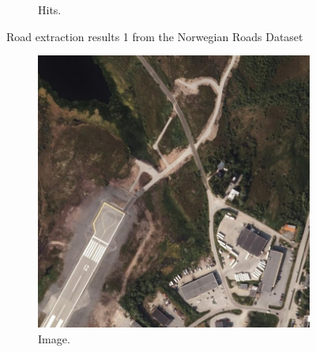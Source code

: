 \begin{figure}[H]
\begin{subfigure}{0.23\textwidth}
\caption{Hits.}
\vspace{0.2cm} %
\end{subfigure}
\caption[Norway Road extraction results 1]{Road extraction results 1 from the Norwegian Roads Dataset} \label{fig:Norway_app_results1}
\end{figure}

\begin{figure}[H]
\begin{subfigure}{0.23\textwidth}
\includegraphics[width=\textwidth]{figs/appendix/img1205.jpg}
\caption{ Image. }
\vspace{0.2cm} %
\end{subfigure}
\hspace*{\fill} %
\begin{subfigure}{0.23\textwidth}

\end{subfigure}
\end{figure}
